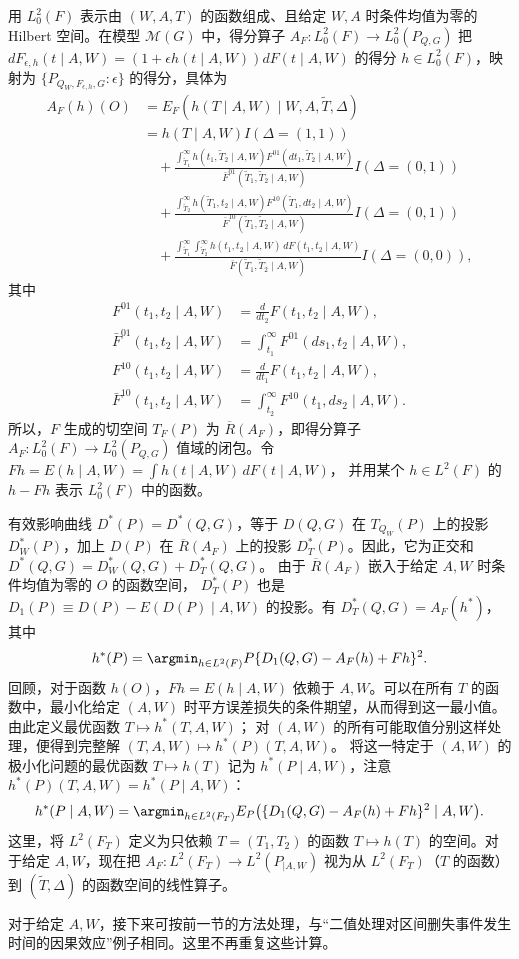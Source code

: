 用 $L_0^2(F)$ 表示由 $(W,A,T)$ 的函数组成、且给定 $W,A$ 时条件均值为零的 Hilbert 空间。在模型 $\mathcal M(G)$ 中，得分算子
$A_F:L_0^2(F)\to L_0^2(P_{Q,G})$
把 $dF_{\epsilon,h}(t\mid A,W)=(1+\epsilon h(t\mid A,W))dF(t\mid A,W)$ 的得分 $h\in L_0^2(F)$，映射为 $\{P_{Q_W,F_{\epsilon,h},G}:\epsilon\}$ 的得分，具体为
\[
 \begin{aligned}
 A_F(h)(O)
 &=E_F(h(T\mid A,W)\mid W,A,\widetilde T,\Delta)\\
 &=h(T\mid A,W)I(\Delta=(1,1))\\
 &\quad+\frac{\int_{\widetilde T_1}^{\infty}
 h(t_1,\widetilde T_2\mid A,W)F^{01}(dt_1,\widetilde T_2\mid A,W)}
 {\bar F^{01}(\widetilde T_1,\widetilde T_2\mid A,W)}I(\Delta=(0,1))\\
 &\quad+\frac{\int_{\widetilde T_2}^{\infty}
 h(\widetilde T_1,t_2\mid A,W)F^{10}(\widetilde T_1,dt_2\mid A,W)}
 {\bar F^{10}(\widetilde T_1,\widetilde T_2\mid A,W)}I(\Delta=(0,1))\\
 &\quad+\frac{\int_{\widetilde T_1}^{\infty}\int_{\widetilde T_2}^{\infty}
 h(t_1,t_2\mid A,W)\,dF(t_1,t_2\mid A,W)}
 {\bar F(\widetilde T_1,\widetilde T_2\mid A,W)}I(\Delta=(0,0)),
 \end{aligned}
\]
其中
\[
 \begin{aligned}
 F^{01}(t_1,t_2\mid A,W)
 &=\frac{d}{dt_2}F(t_1,t_2\mid A,W),\\
 \bar F^{01}(t_1,t_2\mid A,W)
 &=\int_{t_1}^{\infty}F^{01}(ds_1,t_2\mid A,W),\\
 F^{10}(t_1,t_2\mid A,W)
 &=\frac{d}{dt_1}F(t_1,t_2\mid A,W),\\
 \bar F^{10}(t_1,t_2\mid A,W)
 &=\int_{t_2}^{\infty}F^{10}(t_1,ds_2\mid A,W).
 \end{aligned}
\]
所以，$F$ 生成的切空间 $T_F(P)$ 为 $\overline R(A_F)$，即得分算子
$A_F:L_0^2(F)\to L_0^2(P_{Q,G})$
值域的闭包。令
$Fh=E(h\mid A,W)=\int h(t\mid A,W)\,dF(t\mid A,W)$，
并用某个 $h\in L^2(F)$ 的 $h-Fh$ 表示 $L_0^2(F)$ 中的函数。

有效影响曲线 $D^*(P)=D^*(Q,G)$，等于 $D(Q,G)$ 在 $T_{Q_W}(P)$ 上的投影 $D_W^*(P)$，加上 $D(P)$ 在 $\overline R(A_F)$ 上的投影 $D_T^*(P)$。因此，它为正交和
$D^*(Q,G)=D_W^*(Q,G)+D_T^*(Q,G)$。
由于 $\overline R(A_F)$ 嵌入于给定 $A,W$ 时条件均值为零的 $O$ 的函数空间，
$D_T^*(P)$ 也是 $D_1(P)\equiv D(P)-E(D(P)\mid A,W)$ 的投影。有
$D_T^*(Q,G)=A_F(h^*)$，其中
\[
 h^*(P)=\argmin_{h\in L^2(F)}
 P\{D_1(Q,G)-A_F(h)+Fh\}^2.
\]
回顾，对于函数 $h(O)$，$Fh=E(h\mid A,W)$ 依赖于 $A,W$。可以在所有 $T$ 的函数中，最小化给定 $(A,W)$ 时平方误差损失的条件期望，从而得到这一最小值。由此定义最优函数
$T\mapsto h^*(T,A,W)$；
对 $(A,W)$ 的所有可能取值分别这样处理，便得到完整解
$(T,A,W)\mapsto h^*(P)(T,A,W)$。
将这一特定于 $(A,W)$ 的极小化问题的最优函数 $T\mapsto h(T)$ 记为
$h^*(P\mid A,W)$，注意 $h^*(P)(T,A,W)=h^*(P\mid A,W)$：
\[
 h^*(P\mid A,W)=\argmin_{h\in L^2(F_T)}
 E_P\bigl(\{D_1(Q,G)-A_F(h)+Fh\}^2\mid A,W\bigr).
\]
这里，将 $L^2(F_T)$ 定义为只依赖 $T=(T_1,T_2)$ 的函数 $T\mapsto h(T)$ 的空间。对于给定 $A,W$，现在把
$A_F:L^2(F_T)\to L^2(P_{\mid A,W})$
视为从 $L^2(F_T)$（$T$ 的函数）到 $(\widetilde T,\Delta)$ 的函数空间的线性算子。

对于给定 $A,W$，接下来可按前一节的方法处理，与“二值处理对区间删失事件发生时间的因果效应”例子相同。这里不再重复这些计算。
